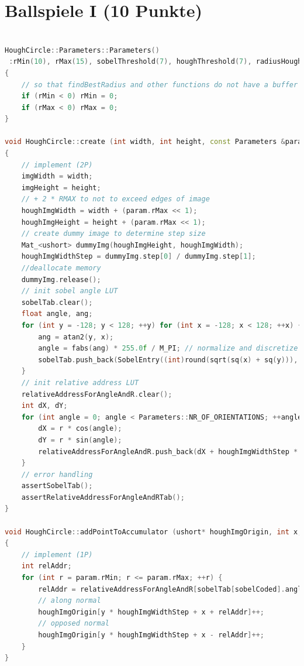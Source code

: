\documentclass{ezb}
\begin{document}

\section{Ballspiele I (10 Punkte)}
\begin{lstlisting}[language=C++]

HoughCircle::Parameters::Parameters()
 :rMin(10), rMax(15), sobelThreshold(7), houghThreshold(7), radiusHoughThreshold(0), localMaxRange(100)
{
	// so that findBestRadius and other functions do not have a buffer overflow
	if (rMin < 0) rMin = 0;
	if (rMax < 0) rMax = 0;
}

void HoughCircle::create (int width, int height, const Parameters &param)
{
    // implement (2P)
	imgWidth = width;
	imgHeight = height;
	// + 2 * RMAX to not to exceed edges of image
	houghImgWidth = width + (param.rMax << 1);
	houghImgHeight = height + (param.rMax << 1);
	// create dummy image to determine step size
	Mat_<ushort> dummyImg(houghImgHeight, houghImgWidth);
	houghImgWidthStep = dummyImg.step[0] / dummyImg.step[1];
	//deallocate memory
	dummyImg.release();
	// init sobel angle LUT
	sobelTab.clear();
	float angle, ang;
	for (int y = -128; y < 128; ++y) for (int x = -128; x < 128; ++x) {
		ang = atan2(y, x);
		angle = fabs(ang) * 255.0f / M_PI; // normalize and discretize angle
		sobelTab.push_back(SobelEntry((int)round(sqrt(sq(x) + sq(y))), (int) round(angle), cos(ang), sin(ang)));
	}
	// init relative address LUT
	relativeAddressForAngleAndR.clear();
	int dX, dY;
	for (int angle = 0; angle < Parameters::NR_OF_ORIENTATIONS; ++angle) for (int r = 0; r <= param.rMax; ++r){
		dX = r * cos(angle);
		dY = r * sin(angle);
		relativeAddressForAngleAndR.push_back(dX + houghImgWidthStep * dY);
	}
	// error handling
	assertSobelTab();
    assertRelativeAddressForAngleAndRTab();
}

void HoughCircle::addPointToAccumulator (ushort* houghImgOrigin, int x, int y, int sobelCoded) const
{
    // implement (1P)
	int relAddr;
	for (int r = param.rMin; r <= param.rMax; ++r) {
		relAddr = relativeAddressForAngleAndR[sobelTab[sobelCoded].angle*(param.rMax+1)+r];
		// along normal
		houghImgOrigin[y * houghImgWidthStep + x + relAddr]++;
		// opposed normal
		houghImgOrigin[y * houghImgWidthStep + x - relAddr]++;
	}
}
\end{lstlisting}
\end{document}
